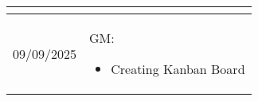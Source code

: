 \begin{longtable}{|l||p{13.5cm}|}
\begin{itemize}[topsep=0pt,itemsep=0pt,parsep=0pt,partopsep=0pt,leftmargin=12pt]
\end{itemize} 
\\ \hline

09/09/2025 & GM:
\begin{itemize}[topsep=0pt,itemsep=0pt,parsep=0pt,partopsep=0pt,leftmargin=12pt]
\item Creating Kanban Board 
\end{itemize} 
\\ \hline



\end{longtable}


